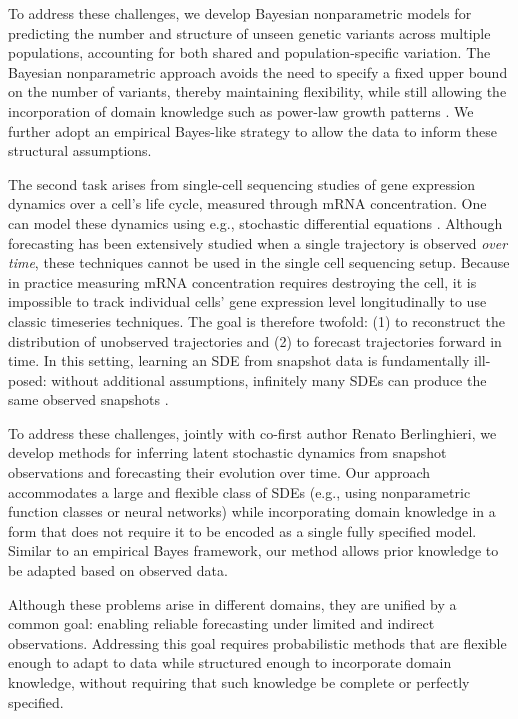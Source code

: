 To address these challenges, we develop Bayesian nonparametric models for predicting the number and structure of unseen genetic variants across multiple populations, accounting for both shared and population-specific variation. The Bayesian nonparametric approach avoids the need to specify a fixed upper bound on the number of variants, thereby maintaining flexibility, while still allowing the incorporation of domain knowledge such as power-law growth patterns \citep{Masoero2022}. We further adopt an empirical Bayes-like strategy to allow the data to inform these structural assumptions.

The second task arises from single-cell sequencing studies of gene expression dynamics over a cell's life cycle, measured through mRNA concentration. One can model these dynamics using e.g., stochastic differential equations \citep[][SDEs]{pratapa2020benchmarking}. Although forecasting has been extensively studied when a single trajectory is observed \textit{over time}, these techniques cannot be used in the single cell sequencing setup. Because in practice measuring mRNA concentration requires destroying the cell, it is impossible to track individual cells' gene expression level longitudinally to use classic timeseries techniques. The goal is therefore twofold: (1) to reconstruct the distribution of unobserved trajectories and (2) to forecast trajectories forward in time. In this setting, learning an SDE from snapshot data is fundamentally ill-posed: without additional assumptions, infinitely many SDEs can produce the same observed snapshots \citep{lavenant2024toward}.

To address these challenges, jointly with co-first author Renato Berlinghieri, we develop methods for inferring latent stochastic dynamics from snapshot observations and forecasting their evolution over time. Our approach accommodates a large and flexible class of SDEs (e.g., using nonparametric function classes or neural networks) while incorporating domain knowledge in a form that does not require it to be encoded as a single fully specified model. Similar to an empirical Bayes framework, our method allows prior knowledge to be adapted based on observed data.

Although these problems arise in different domains, they are unified by a common goal: enabling reliable forecasting under limited and indirect observations. Addressing this goal requires probabilistic methods that are flexible enough to adapt to data while structured enough to incorporate domain knowledge, without requiring that such knowledge be complete or perfectly specified.
